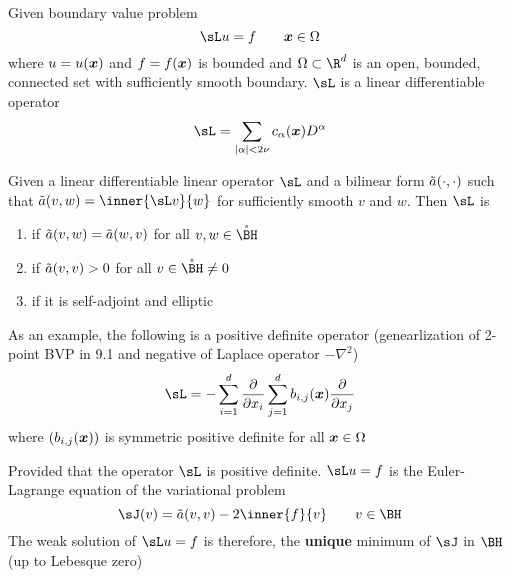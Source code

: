 \documentclass[11pt]{article}
\begin{document}
\subsection{}

\begin{definition*}
     Given boundary value problem
    \[
        \sL u = f
        \quad \quad \bx \in \Omega
    \]
    where $u=u(\bm{x})$ and $f=f(\bm{x})$ is bounded and $\Omega \subset\R^d$ is an open, bounded, connected set with sufficiently smooth boundary. $\sL$ is a linear differentiable operator
    \[
        \sL = \sum_{\abs{\alpha}<2\nu} c_{\alpha}(\bx) D^{\alpha}    
    \]
\end{definition*}

\begin{definition*}
     Given a linear differentiable linear operator $\sL$ and a bilinear form $\tilde{a}(\cdot,\cdot)$ such that $\ta(v,w) = \inner{\sL v}{w}$ for sufficiently smooth $v$ and $w$. Then $\sL$ is
    \begin{enumerate}
        \item {} if $\tilde{a}(v,w)=\tilde{a}(w,v)$ for all $v,w\in\mathring{\BH}$ 
        \item {} if $\tilde{a}(v,v) > 0$ for all $v\in\mathring{\BH} \neq 0$ 
        \item {} if it is self-adjoint and elliptic
    \end{enumerate}
    As an example, the following is a positive definite operator (genearlization of 2-point BVP in 9.1 and negative of Laplace operator $-\nabla^2$)
    \[
        \sL = - \sum_{i=1}^d \frac{\partial }{\partial x_i} \sum_{j=1}^d b_{i,j}(\bx) \frac{\partial }{\partial x_j}    
    \]
    where $(b_{i,j}(\bm{x}))$ is symmetric positive definite for all $\bm{x}\in\Omega$
\end{definition*}


\begin{theorem*}
     Provided that the operator $\sL$ is positive definite. $\sL u = f$ is the Euler-Lagrange equation of the variational problem
    \[
        \sJ(v) = \ta(v,v) - 2\inner{f}{v}
        \quad\quad 
        v\in \BH    
    \]
    The weak solution of $\sL u = f$ is therefore, the \textbf{unique} minimum of $\sJ$ in $\BH$ (up to Lebesque zero)
\end{theorem*}
\end{document}
